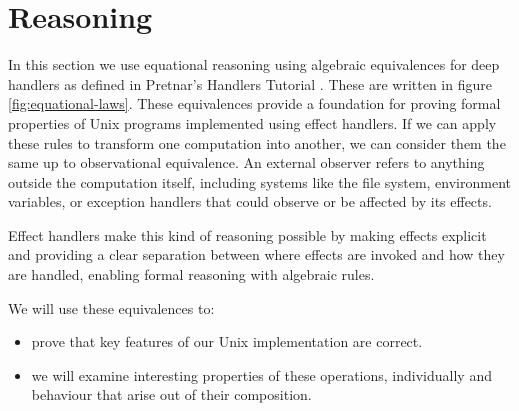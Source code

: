 \documentclass[logo,bsc,singlespacing,parskip]{infthesis}
\begin{document}
\chapter{Reasoning}

In this section we use equational reasoning using algebraic equivalences for deep handlers as defined in Pretnar's Handlers Tutorial \cite{pretnar_introduction_2015}. These are written in figure \ref{fig:equational-laws}.  These equivalences provide a foundation for proving formal properties of Unix programs implemented using effect handlers. If we can apply these rules to transform one computation into another, we can consider them the same up to observational equivalence.
An external observer refers to anything outside the computation itself, including systems like the file system, environment variables, or exception handlers that could observe or be affected by its effects.

Effect handlers make this kind of reasoning possible by making effects explicit and providing a clear separation between where effects are invoked and how they are handled, enabling formal reasoning with algebraic rules.

We will use these equivalences to:
\begin{itemize}
    \item prove that key features of our Unix implementation are correct. 
    \item we will examine interesting properties of these operations, individually and behaviour that arise out of their composition. 
\end{itemize}
\end{document}
